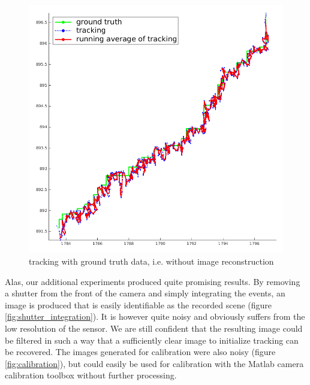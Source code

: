 \begin{figure}
\includegraphics[width=\columnwidth]{images/tracking_without_reconstruction.png}
\caption{tracking with ground truth data, i.e. without image reconstruction}
\label{fig:tracking_groundtruth}
\end{figure}

Alas, our additional experiments produced quite promising results.
By removing a shutter from the front of the camera and simply integrating the events,
an image is produced that is easily identifiable as the recorded scene (figure \ref{fig:shutter_integration}).
It is however quite noisy and obviously suffers from the low resolution of the sensor.
We are still confident that the resulting image could be filtered in such a way that
a sufficiently clear image to initialize tracking can be recovered.
The images generated for calibration were also noisy (figure \ref{fig:calibration}), but could easily be used
for calibration with the Matlab camera calibration toolbox without further processing.

